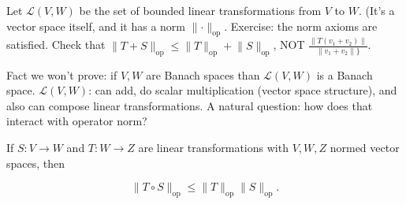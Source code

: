 \begin{definition}

Let \(\mathcal{L}(V, W)\) be the set of bounded linear transformations from \(V\) to \(W\). (It's a vector space itself, and it has a norm \(\lVert \cdot \rVert_{\text{op}}\). Exercise: the norm axioms are satisfied. Check that \(\lVert T + S \rVert_{\text{op}} \leq \lVert T \rVert_\text{op} + \lVert S \rVert_\text{op}\), NOT \(\frac{\lVert T(v_1 + v_2) \rVert}{\lVert v_1 + v_2\rVert\}}\).

\end{definition}

Fact we won't prove: if \(V, W\) are Banach spaces than \(\mathcal{L}(V, W)\) is a Banach space. \(\mathcal{L}(V, W)\): can add, do scalar multiplication (vector space structure), and also can compose linear transformations. A natural question: how does that interact with operator norm?

\begin{proposition}\label{ra.prob.lin.alg.op.norm.ineq}

If \(S: V \to W\) and \(T: W \to Z\) are linear transformations with \(V, W, Z\) normed vector spaces, then 

\[
\lVert T \circ S \rVert_{\text{op}} \leq \lVert T \rVert_{\text{op}} \lVert S \rVert_{\text{op}}.
\]

\end{proposition}

